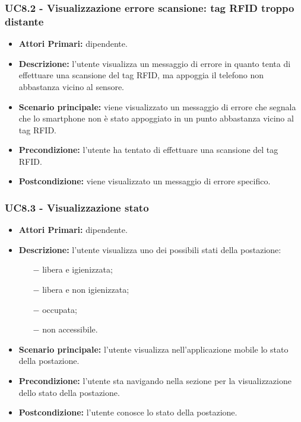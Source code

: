 \subsubsection{ UC8.2 - Visualizzazione errore scansione: tag RFID troppo distante}
\begin{itemize}
	\item\textbf{Attori Primari:} dipendente.
	\item\textbf{Descrizione:} l’utente visualizza un messaggio di errore in quanto tenta di effettuare una scansione del tag RFID, ma appoggia il telefono non abbastanza vicino al sensore.
	\item\textbf{Scenario principale:} viene visualizzato un messaggio di errore che segnala che lo smartphone non è stato appoggiato in un punto abbastanza vicino
	al tag RFID.
	\item\textbf{Precondizione:} l’utente ha tentato di effettuare una scansione del tag RFID.
	\item\textbf{Postcondizione:} viene visualizzato un messaggio di errore specifico.
\end{itemize}
\subsubsection{ UC8.3 - Visualizzazione stato}
\begin{itemize}
	\item\textbf{Attori Primari:} dipendente.
	\item\textbf{Descrizione:} l’utente visualizza uno dei possibili stati della postazione:
	\begin{itemize}
	\item[$-$]libera e igienizzata;
	\item[$-$]libera e non igienizzata;
	\item[$-$]occupata;
	\item[$-$]non accessibile.
    \end{itemize}
	\item\textbf{Scenario principale:} l’utente visualizza nell'applicazione mobile lo stato della postazione.
	\item\textbf{Precondizione:} l’utente sta navigando nella sezione per la visualizzazione dello stato della postazione.
	\item\textbf{Postcondizione:} l’utente conosce lo stato della postazione.
\end{itemize}

